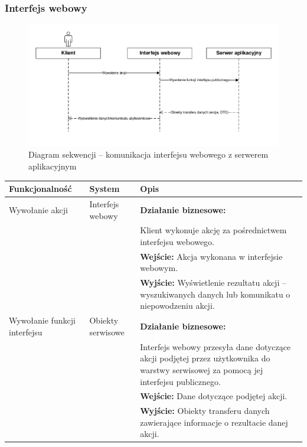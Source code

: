\documentclass[10pt,a4paper]{article}
\begin{document}
\subsubsection{Interfejs webowy}
\begin{figure}[H]
	\includegraphics[width=16cm]{Resources/PDF/sequence-web.pdf}
	\caption{Diagram sekwencji -- komunikacja interfejsu webowego z serwerem aplikacyjnym}
\end{figure}
\begin{table}[H]
	\begin{tabularx}{\textwidth}{|l|l|X|}
		\hline
		\textbf{Funkcjonalność} & \textbf{System} & \textbf{Opis} \\
		\hline
		Wywołanie akcji &
		Interfejs webowy &
		\textbf{Działanie biznesowe:} \\
		& & Klient wykonuje akcję za pośrednictwem interfejsu webowego. \\
		& & \textbf{Wejście:} Akcja wykonana w interfejsie webowym. \\
		& & \textbf{Wyjście:} Wyświetlenie rezultatu akcji -- wyszukiwanych danych lub komunikatu o niepowodzeniu akcji. \\
		\hline
		Wywołanie funkcji interfejsu &
		Obiekty serwisowe &
		\textbf{Działanie biznesowe:} \\
		& & Interfejs webowy przesyła dane dotyczące akcji podjętej przez użytkownika do warstwy serwisowej za pomocą jej interfejsu publicznego. \\
		& & \textbf{Wejście:} Dane dotyczące podjętej akcji. \\
		& & \textbf{Wyjście:} Obiekty transferu danych zawierające informacje o rezultacie danej akcji. \\
		\hline
	\end{tabularx}
\end{table}
\end{document}
